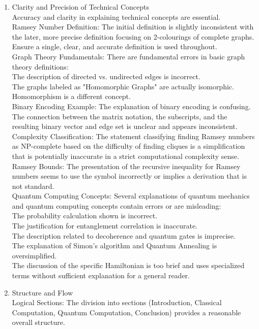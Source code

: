 \documentclass{Assignment}
\begin{document}
\begin{enumerate}
\\
\item Clarity and Precision of Technical Concepts
\\
Accuracy and clarity in explaining technical concepts are essential.
\\
Ramsey Number Definition: The initial definition is slightly inconsistent with the later, more precise definition focusing on 2-colourings of complete graphs. Ensure a single, clear, and accurate definition is used throughout.
\\
Graph Theory Fundamentals: There are fundamental errors in basic graph theory definitions:
\\
The description of directed vs. undirected edges is incorrect.
\\
The graphs labeled as "Homomorphic Graphs" are actually isomorphic. Homomorphism is a different concept.
\\
Binary Encoding Example: The explanation of binary encoding is confusing. The connection between the matrix notation, the subscripts, and the resulting binary vector and edge set is unclear and appears inconsistent.
\\
Complexity Classification: The statement classifying finding Ramsey numbers as NP-complete based on the difficulty of finding cliques is a simplification that is potentially inaccurate in a strict computational complexity sense.
\\
Ramsey Bounds: The presentation of the recursive inequality for Ramsey numbers seems to use the symbol incorrectly or implies a derivation that is not standard.
\\
Quantum Computing Concepts: Several explanations of quantum mechanics and quantum computing concepts contain errors or are misleading:
\\
The probability calculation shown is incorrect.
\\
The justification for entanglement correlation is inaccurate.
\\
The description related to decoherence and quantum gates is imprecise.
\\
The explanation of Simon's algorithm and Quantum Annealing is oversimplified.
\\
The discussion of the specific Hamiltonian is too brief and uses specialized terms without sufficient explanation for a general reader.
\\
\item Structure and Flow
\\
Logical Sections: The division into sections (Introduction, Classical Computation, Quantum Computation, Conclusion) provides a reasonable overall structure.

\end{enumerate}
\end{document}
